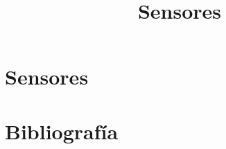 \documentclass[aspectratio=169,compress]{beamer}
\title{Sensores}
\author{}
\institute{Universidad Nacional de Rosario}
\date{}
\begin{document}
\frame{\titlepage}

\section{Sensores}




























\section{Bibliografía}

\end{document}
